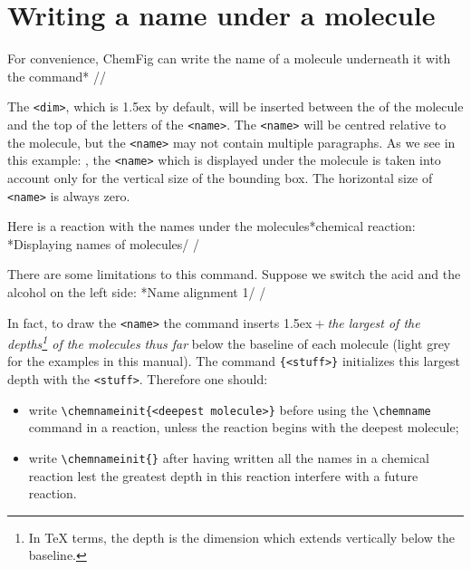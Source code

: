 \documentclass[10pt]{article}
\makeatletter
\newcommand\idx{\@ifstar{\let\print@or@not\@gobble\idx@}{\let\print@or@not\@firstofone\idx@}}
\newcommand\idx@[1]{%
	\ifcat\expandafter\noexpand\@car#1\@nil\relax%
		\expandafter\ifx\@car#1\@nil\protect
			\index{#1}%
			\print@or@not{#1}%
		\else
			\saveexpandmode\expandarg
			\StrSubstitute{\string#1}{\string @}{\@empty\protect\symbol{'100}}[\temp@]%
			\StrGobbleLeft\temp@1[\temp@]%
			\restoreexpandmode
			\expandafter\index\expandafter{\temp@ @\protect\texttt{\protect\textbackslash\temp@}}%
			\print@or@not{\texttt{\string#1}}%
		\fi
	\else
		\index{#1}%
		\print@or@not{#1}%
	\fi
}
\newcommand\make@car@active[1]{%
	\catcode`#1\active
	\begingroup
		\lccode`\~`#1\relax
		\lowercase{\endgroup\def~}%
}
\newif\if@exstar
\newcommand\exemple{%
	\begingroup
	\parskip\z@
	\@makeother\;\@makeother\!\@makeother\?\@makeother\:%
	\@ifstar{\@exstartrue\exemple@}{\@exstarfalse\exemple@}}
\newcommand\exemple@[2][65]{%
	\medbreak\noindent
	\begingroup
		\let\do\@makeother\dospecials
		\make@car@active\ { {}}%
		\make@car@active\^^M{\par\leavevmode}%
		\make@car@active\,{\leavevmode\kern\z@\string,}%
		\make@car@active\-{\leavevmode\kern\z@\string-}%
		\make@car@active\>{\leavevmode\kern\z@\string>}%
		\make@car@active\<{\leavevmode\kern\z@\string<}%
		\exemple@@{#1}{#2}%
}
\newcommand\exemple@@[3]{%
	\def\@tempa##1#3{\exemple@@@{#1}{#2}{##1}}%
	\@tempa
}
\newcommand\exemple@@@[3]{%
	\xdef\the@code{#3}%
	\endgroup
	\if@exstar
		\begingroup
			\fboxrule0.4pt
			\let\breakboxparindent\z@
			\def\bkvz@bottom{\hrule\@height\fboxrule}%
			\let\bkvz@before@breakbox\relax
			\def\bkvz@set@linewidth{\advance\linewidth\dimexpr-2\fboxrule-2\fboxsep}%
			\def\bkvz@left{\vrule\@width\fboxrule\hskip\fboxsep}%
			\def\bkvz@right{\hskip\fboxsep\vrule\@width\fboxrule}%
			\def\bkvz@top{\hbox to \hsize{%
				\vrule\@width\fboxrule\@height\fboxrule
				\leaders\bkvz@bottom\hfill
				\ECFAugie
				\fboxsep\z@
				\colorbox{black}{\kern0.25em\color{white}\footnotesize\lower0.5ex\hbox{\strut#2}\kern0.25em}%
				\leaders\bkvz@bottom\hfill
				\vrule\@width\fboxrule\@height\fboxrule}}%
			\breakbox
				\kern.5ex\relax
				\ttfamily\footnotesize\the@code\par
				\normalfont
				\kern3pt
				\hrule height0.1pt width\linewidth depth0.1pt
				\vskip5pt
				\rightskip0pt plus 1fill
				\everypar{{\color{lightgray}\rlap{\vrule height0.1pt width\linewidth depth0.1pt}}\hskip0pt plus 1fill}%
				\newlinechar`\^^M\everyeof{\noexpand}\scantokens{#3}\par
			\endbreakbox
		\endgroup
	\else
		\vskip0.5ex
		\boxput*(0,1)
			{\fboxsep\z@
			\hbox{\ECFAugie\colorbox{black}{\leavevmode\kern0.25em{\color{white}\footnotesize\strut#2}\kern0.25em}}%
			}%
			{\fboxsep5pt
			\fbox{%
				$\vcenter{\hsize\dimexpr0.#1\linewidth-\fboxsep-\fboxrule\relax
					\kern5pt\parskip0pt \ttfamily\footnotesize\the@code}%
				\vcenter{\kern5pt\hsize\dimexpr\linewidth-0.#1\linewidth-\fboxsep-\fboxrule\relax
					\everypar{{\color{lightgray}\rlap{\vrule height0.1pt width\dimexpr\linewidth-0.#1\linewidth-\fboxsep-\fboxrule depth0.1pt}}}%
					\footnotesize\newlinechar`\^^M\everyeof{\noexpand}\scantokens{#3}}$%
				}%
			}%
	\fi
	\medbreak
	\endgroup
}
\let\do\@makeother\dospecials
\newcommand\CF{{\ECFAugie ChemFig}\xspace}
\makeatother
\begin{document}
\section{Writing a name under a molecule}\label{chemname}
For convenience, \CF can write the name of a molecule underneath it with the command\idx*\chemname
\centerverb//
\smallskip

The \verb-<dim>-, which is 1.5ex by default, will be inserted between the \idx{baseline} of the molecule and the top of the letters of the \verb-<name>-. The \verb-<name>- will be centred relative to the molecule, but the \verb-<name>- may not contain multiple paragraphs. As we see in this example: , the \verb-<name>- which is displayed under the molecule is taken into account only for the vertical size of the bounding box. The horizontal size of \verb-<name>- is always zero.

Here is a reaction with the names under the molecules\idx*{chemical reaction}:
\exemple*{Displaying names of molecules}/
\chemsign{+}
\chemrel{->}
\chemsign{+}
/

There are some limitations to this command. Suppose we switch the acid and the alcohol on the left side:
\exemple*{Name alignment 1}/
\chemsign{+}
\chemrel{->}
\chemsign{+}
/

In fact, to draw the \verb-<name>- the command \idx{\chemname} inserts 1.5ex${}+{}$\emph{the largest of the depths\footnote{In \TeX{} terms, the depth is the dimension which extends vertically below the baseline.} of the molecules thus far} below the baseline of each molecule (light grey for the examples in this manual). The command \idx{\chenameinit}\verb-{<stuff>}- initializes this largest depth with the \verb-<stuff>-. Therefore one should:
\begin{itemize}
	\item write \verb-\chemnameinit{<deepest molecule>}- before using the \verb-\chemname- command in a reaction, unless the reaction begins with the deepest molecule;
	\item write \verb-\chemnameinit{}- after having written all the names in a chemical reaction lest the greatest depth in this reaction interfere with a future reaction.
\end{itemize}
\end{document}
